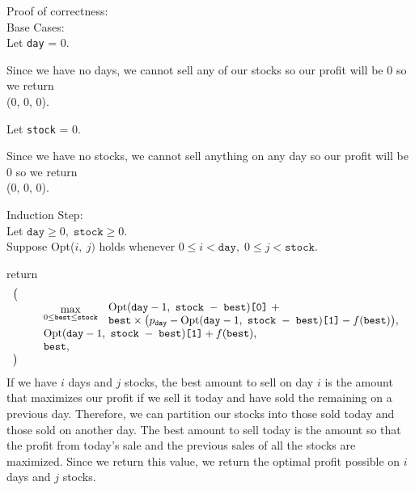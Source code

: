 \documentclass[12pt]{article}
\begin{document}
\newpage
Proof of correctness:\\
Base Cases:\\
\hspace*{1em} Let \texttt{day} = 0.
\begin{adjustwidth}{2em}{}
	Since we have no days,
	we cannot sell any of our stocks so our profit will be 0 so we return\\ (0, 0, 0).
\end{adjustwidth}
\hspace*{1em} Let \texttt{stock} = 0.
\begin{adjustwidth}{2em}{}
	Since we have no stocks, we cannot sell anything on any day so our profit will be 0 so we return\\ (0, 0, 0).
\end{adjustwidth}

Induction Step:\\
\hspace*{1em} Let $\texttt{day} \geq 0,\; \texttt{stock} \geq 0$.\\
\hspace*{1em} Suppose Opt($i,\ j)$ holds whenever $0 \leq i < \texttt{day},\;0 \leq j < \texttt{stock}$.
\begin{adjustwidth}{2em}{}
	return
	\begin{equation*}
		\begin{array}{l}
			\big(                                                                                               \\
			\hspace*{10mm}
			\max\limits_{0 \leq \texttt{best} \leq \texttt{stock}}
			\raisebox{-1.5mm}{
				$
					\begin{array}{l}
						\text{Opt}(\texttt{day}-1,\ \texttt{stock $-$ best})\texttt{[0]}\ + \\
						\texttt{best} \times\big(p_\texttt{day} - \text{Opt}(\texttt{day}-1,\ \texttt{stock $-$ best})\texttt{[1]} - f(\texttt{best})\big),
					\end{array}
				$
			}                                                                                                   \\
			\hspace*{10mm} \text{Opt}(\texttt{day}-1,\ \texttt{stock $-$ best})\texttt{[1]} + f(\texttt{best}), \\
			\hspace*{10mm} \texttt{best},                                                                       \\
			\big)
		\end{array}
	\end{equation*}
	If we have $i$ days and $j$ stocks, the best amount to sell on day $i$ is the amount that maximizes
	our profit if we sell it today and have sold the remaining on a previous day. Therefore, we can partition our stocks into those
	sold today and those sold on another day. The best amount to sell today is the amount so that the
	profit from today's sale and the previous sales of all the stocks are maximized. Since we return
	this value, we return the optimal profit possible on $i$ days and $j$ stocks.
\end{adjustwidth}
\end{document}
